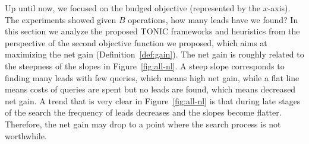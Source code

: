 \documentclass[journal]{IEEEtran}
\begin{document}
Up until now, we focused on the budged objective (represented by the $x$-axis). The experiments showed given $B$ operations, how many leads have we found?
In this section we analyze the proposed TONIC frameworks and heuristics from the perspective of the second objective function we proposed, which aims at maximizing the net gain (Definition~\ref{def:gain}). 
The net gain is roughly related to the steepness of the slopes in Figure~\ref{fig:all-nl}. A steep slope corresponds to finding many leads with few queries, which means high net gain, while a flat line means costs of queries are spent but no leads are found, which means decreased net gain. A trend that is very clear in Figure~\ref{fig:all-nl} is that during late stages of the search the frequency of leads decreases and the slopes become flatter. Therefore, the net gain may drop to a point where the search process is not worthwhile.
\end{document}
